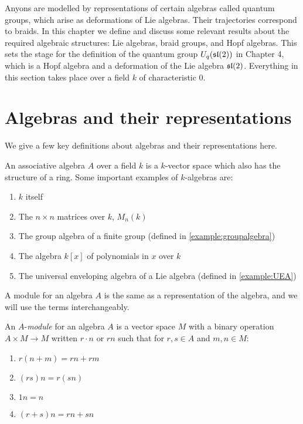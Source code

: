 Anyons are modelled by representations of certain algebras called quantum
groups, which arise as deformations of Lie algebras. Their trajectories
correspond to braids. In this chapter
we define and discuss some relevant results about the required algebraic
structures: Lie algebras, braid groups, and Hopf algebras. This sets the stage
for the definition of the quantum group $U_q(\mathfrak{sl}(2))$ in Chapter 4, which is a
Hopf algebra and a deformation of the Lie algebra $\mathfrak{sl}(2)$. Everything in this
section takes place over a field $k$ of characteristic 0.

\section{Algebras and their representations}

We give a few key definitions about algebras and their representations here.  

An associative algebra $A$ over a field $k$ is a $k$-vector space which also
has the structure of a ring. Some important examples of $k$-algebras are: 

\begin{enumerate}
    \item $k$ itself
    \item The $n \times n$ matrices over $k$, $M_n(k)$
    \item The group algebra of a finite group (defined in \ref{example:groupalgebra})
    \item The algebra $k[x]$ of polynomials in $x$ over $k$
    \item The universal enveloping algebra of a Lie algebra (defined in \ref{example:UEA})
\end{enumerate}

A module for an algebra $A$ is the same as a representation of the algebra, and
we will use the terms interchangeably. 

\begin{defn}
    An $A$-\emph{module} for an algebra $A$ is a vector space $M$ with a binary
    operation $A \times M \to M$ written $r\cdot n$ or $rn$ such that for $r,s
    \in A$ and $m,n \in M$:

    \begin{enumerate}
        \item $r(n + m) = rn + rm$
        \item $(rs)n = r(sn)$
        \item $1n = n$
        \item $(r+s)n = rn + sn$
    \end{enumerate}
\end{defn}


